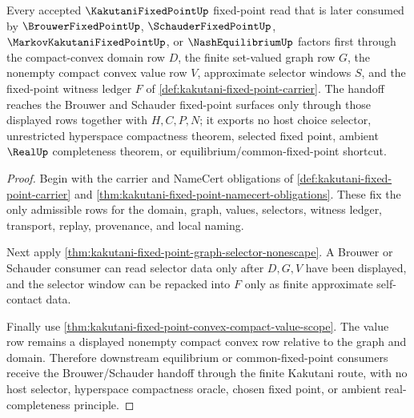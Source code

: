 \begin{theorem}\label{thm:kakutani-fixed-point-brouwer-schauder-handoff}
Every accepted $\KakutaniFixedPointUp$ fixed-point read that is later consumed by $\BrouwerFixedPointUp$, $\SchauderFixedPointUp$, $\MarkovKakutaniFixedPointUp$, or $\NashEquilibriumUp$ factors first through the compact-convex domain row $D$, the finite set-valued graph row $G$, the nonempty compact convex value row $V$, approximate selector windows $S$, and the fixed-point witness ledger $F$ of \autoref{def:kakutani-fixed-point-carrier}. The handoff reaches the Brouwer and Schauder fixed-point surfaces only through those displayed rows together with $H,C,P,N$; it exports no host choice selector, unrestricted hyperspace compactness theorem, selected fixed point, ambient $\RealUp$ completeness theorem, or equilibrium/common-fixed-point shortcut.
\end{theorem}
\begin{proof}
Begin with the carrier and NameCert obligations of \autoref{def:kakutani-fixed-point-carrier} and \autoref{thm:kakutani-fixed-point-namecert-obligations}. These fix the only admissible rows for the domain, graph, values, selectors, witness ledger, transport, replay, provenance, and local naming.

Next apply \autoref{thm:kakutani-fixed-point-graph-selector-nonescape}. A Brouwer or Schauder consumer can read selector data only after $D,G,V$ have been displayed, and the selector window can be repacked into $F$ only as finite approximate self-contact data.

Finally use \autoref{thm:kakutani-fixed-point-convex-compact-value-scope}. The value row remains a displayed nonempty compact convex row relative to the graph and domain. Therefore downstream equilibrium or common-fixed-point consumers receive the Brouwer/Schauder handoff through the finite Kakutani route, with no host selector, hyperspace compactness oracle, chosen fixed point, or ambient real-completeness principle.
\end{proof}



